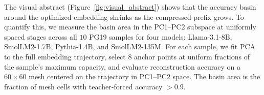 %
%

The visual abstract (Figure~\ref{fig:visual_abstract}) shows that the accuracy basin around the optimized embedding shrinks as the compressed prefix grows. To quantify this, we measure the basin area in the PC1--PC2 subspace at uniformly spaced stages across all $10$ PG19 samples for four models: Llama-3.1-8B, SmolLM2-1.7B, Pythia-1.4B, and SmolLM2-135M. For each sample, we fit PCA to the full embedding trajectory, select $8$ anchor points at uniform fractions of the sample's maximum capacity, and evaluate reconstruction accuracy on a $60\times60$ mesh centered on the trajectory in PC1--PC2 space. The basin area is the fraction of mesh cells with teacher-forced accuracy $>0.9$.

